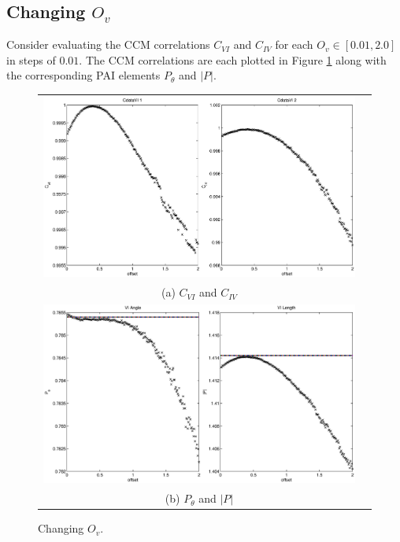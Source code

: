 \documentclass[a4paper,11pt]{article}
\begin{document}
\subsection{Changing $O_v$}
Consider evaluating the CCM correlations $C_{VI}$ and $C_{IV}$ for each $O_v\in[0.01,2.0]$ in steps of $0.01$.  The CCM correlations are each plotted in Figure \ref{fig:Ov} along with the corresponding PAI elements $P_\theta$ and $|P|$.
\begin{figure}[H]
\begin{tabular}{cc}
\includegraphics[scale=0.5]{RLCircuitPlots/RLcirc_varyV_offset2.eps} \\
(a) $C_{VI}$ and $C_{IV}$ \\[6pt]
\includegraphics[scale=0.5]{RLCircuitPlots/RLcirc_varyV_offset.eps} \\
(b) $P_\theta$ and $|P|$ \\[6pt]
\end{tabular}
\caption{Changing $O_v$.}
\label{fig:Ov}
\end{figure}
\end{document}
